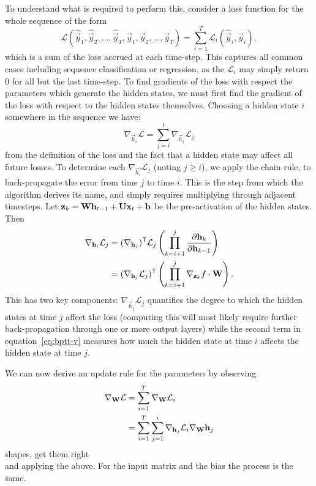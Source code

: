 To understand what is required to perform this, consider a loss function for the whole sequence of
the form
\begin{equation}
	\mathcal{L}(\hat{\vec{y}}_1, \hat{\vec{y}}_2, \dots, \hat{\vec{y}}_T,
				\vec{y}_1, \vec{y}_2, \dots, \vec{y}_T)
	= \sum_{i=1}^T \mathcal{L}_i(\hat{\vec{y}}_i, \vec{y}_i),
	\label{eq:seqloss}
\end{equation} which is a sum of the loss accrued at each time-step. This captures all common
cases including sequence classification or regression, as the \(\mathcal{L}_i\) may simply return
\(0\) for all but the last time-step. To find gradients of the loss with respect the parameters
which generate the hidden states, we must first find the gradient of the loss with respect to the
hidden states themselves. Choosing a hidden state \(i\) somewhere in the sequence we have:
\begin{equation}
	\nabla_{\vec{h}_i}\mathcal{L} = \sum_{j=i}^t \nabla_{\vec{h}_i}\mathcal{L}_j
	\label{eq:delhL}
\end{equation} from the definition of the loss and the fact that a hidden state may affect all
future losses. To determine each \(\nabla_{\vec{h_i}}\mathcal{L}_j\) (noting \(j \geq i\)), we
apply the chain rule, to back-propagate the error from time \(j\) to time \(i\). This is the step
from which the algorithm derives its name, and simply requires multiplying through adjacent
timesteps. Let \(\mathbf{z}_k = \mathbf{W}\mathbf{h}_{t-1} + \mathbf{U}\mathbf{x}_t +  \mathbf{b}\) be the
pre-activation of the hidden states. Then
\begin{align}
	\nabla_{\mathbf{h}_i} \mathcal{L}_j &= 
	(\nabla_{\mathbf{h}_j})^{\mathsf{T}}\mathcal{L}_j \left(
		\prod_{k=i+1}^j \frac{\partial \mathbf{h}_k}{\partial\mathbf{h}_{k-1}}\right)\\
	&=  (\nabla_{\mathbf{h}_j}\mathcal{L}_j)^{\mathsf{T}} \left(
		\prod_{k=i+1}^j \nabla_{\mathbf{z}_k}f \cdot \mathbf{W}\right).
	\label{eq:bptt-v}
\end{align} This has two key components: \(\nabla_{\vec{h}_j}\mathcal{L}_j\) quantifies the degree
to which the hidden states at time \(j\) affect the loss (computing this will most likely require
further back-propagation through one or more output layers) while the second term in
equation~\eqref{eq:bptt-v} measures how much the hidden state at time \(i\) affects the hidden
state at time \(j\).

We can now derive an update rule for the parameters by observing
\begin{align}
	\nabla_{\mathbf{W}} \mathcal{L} &= \sum_{i=1}^T \nabla_{\mathbf{W}} \mathcal{L}_i \\
	&= \sum_{i=1}^T\sum_{j=1}^i\nabla_{\mathbf{h}_j} \mathcal{L}_i \nabla_{\mathbf{W}} \mathbf{h}_j
\end{align} 
{\Large shapes, get them right}\\
and applying the above. For the input matrix and the bias the process is the same.


